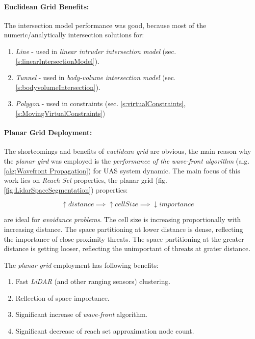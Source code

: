 \paragraph{Euclidean Grid Benefits:} The intersection model performance was good, because most of the numeric/analytically intersection solutions for:
\begin{enumerate}
    \item \emph{Line} - used in \emph{linear intruder intersection model} (sec. \ref{s:linearIntersectionModel}).
    
    \item \emph{Tunnel} - used in \emph{body-volume intersection model} (sec. \ref{s:bodyvolumeIntersection}).
    
    \item \emph{Polygon} - used in constraints (sec. \ref{s:virtualConstraints}, \ref{s:MovingVirtualConstraints})
\end{enumerate}

\paragraph{Planar Grid Deployment:} The shortcomings and benefits of \emph{euclidean grid} are obvious, the main reason why the \emph{planar gird} was employed is the \emph{performance of the wave-front algorithm} (alg. \ref{alg:Wavefront Propagation}) for UAS system dynamic. The main focus of this work lies on \emph{Reach Set} properties, the planar grid (fig. \ref{fig:LidarSpaceSegmentation}) properties:

\begin{equation*}
    \uparrow distance \implies \uparrow cell Size \implies \downarrow importance
\end{equation*}

\noindent are ideal for \emph{avoidance problems}. The cell size is increasing proportionally with increasing distance. The space partitioning at lower distance is dense, reflecting the importance of close proximity threats. The space partitioning at the greater distance is getting looser, reflecting the unimportant of threats at grater distance. 

\noindent The \emph{planar grid} employment has following benefits:
\begin{enumerate}
    \item Fast \emph{LiDAR} (and other ranging sensors) clustering.
    \item Reflection of space importance.
    \item Significant increase of \emph{wave-front} algorithm.
    \item Significant decrease of reach set approximation node count.
\end{enumerate}

